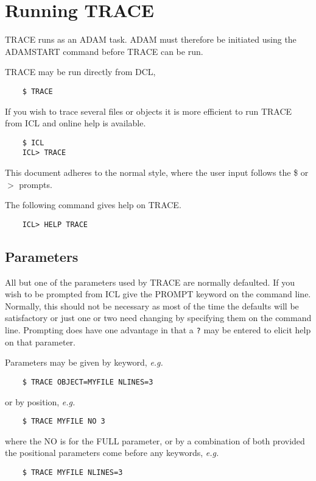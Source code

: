 \section{Running TRACE}

{\small TRACE} runs as an ADAM task.
ADAM must therefore be initiated using the ADAMSTART command before 
{\small TRACE} can be run.

{\small TRACE} may be run directly from DCL,
\small
\begin{verbatim}
    $ TRACE
\end{verbatim}
\normalsize
If you wish to trace several files or objects 
it is more efficient to run {\small TRACE} from ICL and online
help is available.
\small
\begin{verbatim}
    $ ICL
    ICL> TRACE
\end{verbatim}
\normalsize
This document adheres to the normal style, where the user input follows
the \$ or $>$ prompts.

The following command gives help on TRACE.
\small
\begin{verbatim}
    ICL> HELP TRACE
\end{verbatim}
\normalsize

\subsection{Parameters}
All but one of the parameters used by {\small TRACE} are normally
defaulted.  If you wish to be prompted from ICL give the PROMPT keyword
on the command line.  Normally, this should not be necessary as most of
the time the defaults will be satisfactory or just one or two need
changing by specifying them on the command line.  Prompting does have
one advantage in that a {\tt ?} may be entered to elicit help on that
parameter.

Parameters may be
given by keyword, {\it e.g.}\
\small
\begin{verbatim}
    $ TRACE OBJECT=MYFILE NLINES=3
\end{verbatim}
\normalsize
or by position, {\it e.g.}\
\small
\begin{verbatim}
    $ TRACE MYFILE NO 3
\end{verbatim}
\normalsize
where the NO is for the FULL parameter, or by a combination of both
provided the positional parameters come before any keywords, {\it e.g.}\
\small
\begin{verbatim}
    $ TRACE MYFILE NLINES=3
\end{verbatim}
\normalsize


